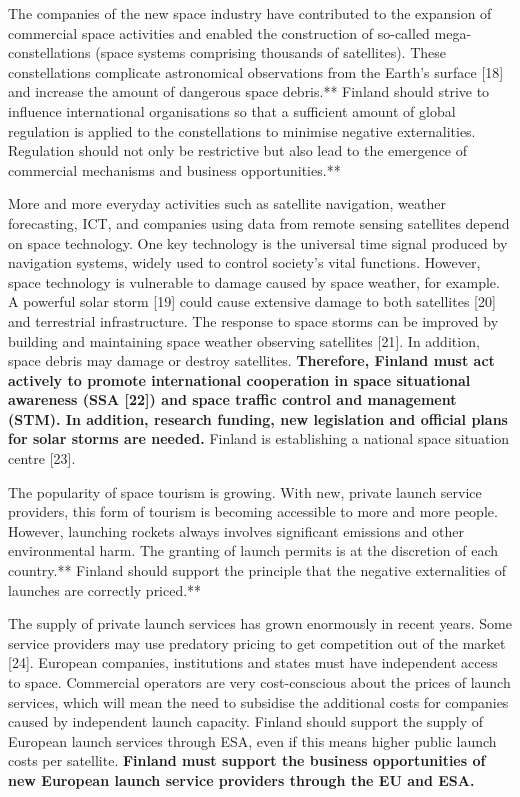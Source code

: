 \documentclass[nobib,finnish,oneside,openany,notoc,a4paper]{tufte-book}
\begin{document}
{The companies of the new space industry have contributed to the
expansion of commercial space activities and enabled the construction of
so-called mega-constellations (space systems comprising thousands of
satellites). These constellations complicate astronomical observations
from the Earth's surface {[}18{]} and increase the amount of dangerous
space debris.** Finland should strive to influence international
organisations so that a sufficient amount of global regulation is
applied to the constellations to minimise negative externalities.
Regulation should not only be restrictive but also lead to the emergence
of commercial mechanisms and business opportunities.**

More and more everyday activities such as satellite navigation, weather
forecasting, ICT, and companies using data from remote sensing
satellites depend on space technology. One key technology is the
universal time signal produced by navigation systems, widely used to
control society's vital functions. However, space technology is
vulnerable to damage caused by space weather, for example. A powerful
solar storm {[}19{]} could cause extensive damage to both satellites
{[}20{]} and terrestrial infrastructure. The response to space storms
can be improved by building and maintaining space weather observing
satellites {[}21{]}. In addition, space debris may damage or destroy
satellites. \textbf{Therefore, Finland must act actively to promote
international cooperation in space situational awareness (SSA {[}22{]})
and space traffic control and management (STM). In addition, research
funding, new legislation and official plans for solar storms are
needed.} Finland is establishing a national space situation centre
{[}23{]}.

The popularity of space tourism is growing. With new, private launch
service providers, this form of tourism is becoming accessible to more
and more people. However, launching rockets always involves significant
emissions and other environmental harm. The granting of launch permits
is at the discretion of each country.** Finland should support the
principle that the negative externalities of launches are correctly
priced.**

The supply of private launch services has grown enormously in recent
years. Some service providers may use predatory pricing to get
competition out of the market {[}24{]}. European companies, institutions
and states must have independent access to space. Commercial operators
are very cost-conscious about the prices of launch services, which will
mean the need to subsidise the additional costs for companies caused by
independent launch capacity. Finland should support the supply of
European launch services through ESA, even if this means higher public
launch costs per satellite. \textbf{Finland must support the business
opportunities of new European launch service providers through the EU
and ESA.}

}
\end{document}
